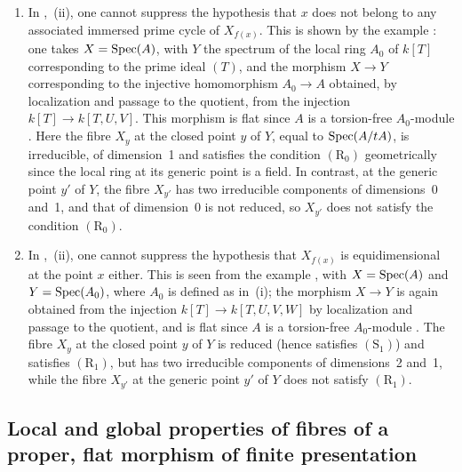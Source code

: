 \begin{remarks}[12.1.8]
\label{IV.12.1.8}
\begin{enumerate}[label=(\roman*)]
  \item In ,~(ii), one cannot suppress the hypothesis that $x$ does not belong to any associated immersed prime cycle of $X_{f(x)}$.
This is shown by the example : one takes $X=\operatorname{Spec}(A)$, with $Y$ the spectrum of the local ring $A_0$ of $k[T]$ corresponding to the prime ideal $(T)$, and the morphism $X\to Y$ corresponding to the injective homomorphism $A_0\to A$ obtained, by localization and passage to the quotient, from the injection $k[T]\to k[T,U,V]$.
This morphism is flat since $A$ is a torsion-free $A_0$-module .
Here the fibre $X_y$ at the closed point $y$ of $Y$, equal to $\operatorname{Spec}(A/tA)$, is irreducible, of dimension~1 and satisfies the condition $(\mathrm{R}_0)$ geometrically since the local ring at its generic point is a field.
In contrast, at the generic point $y'$ of $Y$, the fibre $X_{y'}$ has two irreducible components of dimensions~0 and~1, and that of dimension~0 is not reduced, so $X_{y'}$ does not satisfy the condition $(\mathrm{R}_0)$.

  \item In ,~(ii), one cannot suppress the hypothesis that $X_{f(x)}$ is equidimensional at the point $x$ either.
This is seen from the example , with $X=\operatorname{Spec}(A)$ and $Y=\operatorname{Spec}(A_0)$, where $A_0$ is defined as in~(i); the morphism $X\to Y$ is again obtained from the injection $k[T]\to k[T,U,V,W]$ by localization and passage to the quotient, and is flat since $A$ is a torsion-free $A_0$-module .
The fibre $X_y$ at the closed point $y$ of $Y$ is reduced (hence satisfies $(\mathrm{S}_1)$) and satisfies $(\mathrm{R}_1)$, but has two irreducible components of dimensions~2 and~1, while the fibre $X_{y'}$ at the generic point $y'$ of $Y$ does not satisfy $(\mathrm{R}_1)$.
\end{enumerate}
\end{remarks}


\subsection{Local and global properties of fibres of a proper, flat morphism of finite presentation}
\label{subsection:IV.12.2}


